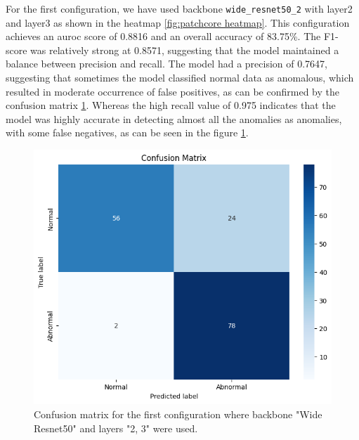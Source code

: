 For the first configuration, we have used backbone \texttt{wide\_resnet50\_2} with layer2 and layer3 as shown in the heatmap \ref{fig:patchcore heatmap}. This configuration achieves an \gls{auroc} score of 0.8816 and an overall accuracy of 83.75\%. The F1-score was relatively strong at 0.8571, suggesting that the model maintained a balance between precision and recall. The model had a precision of 0.7647, suggesting that sometimes the model classified normal data as anomalous, which resulted in moderate occurrence of false positives, as can be confirmed by the confusion matrix \ref{fig:patchcore config1 confusion matrix}. Whereas the high recall value of 0.975 indicates that the model was highly accurate in detecting almost all the anomalies as anomalies, with some false negatives, as can be seen in the figure \ref{fig:patchcore config1 confusion matrix}.

\begin{figure}[ht!]
    \centering
    \includegraphics[width=1\linewidth]{Rohit_Master_Thesis//Images/patchcore_config1_confusion_matrix.jpg}
    \caption{Confusion matrix for the first configuration where backbone "Wide Resnet50" and layers "2, 3" were used.}
    \label{fig:patchcore config1 confusion matrix}
\end{figure}

